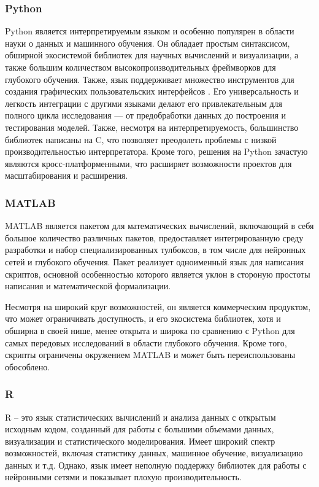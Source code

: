 \subsubsection{Python}
Python является интерпретируемым языком и особенно популярен в области науки о
данных и машинного обучения. Он обладает простым синтаксисом, обширной
экосистемой библиотек для научных вычислений и визуализации, а также большим
количеством высокопроизводительных фреймворков для глубокого обучения. Также,
язык поддерживает множество инструментов для создания графических
пользовательских интерфейсов \cite{bib:gui:web:model}. Его универсальность и
легкость интеграции с другими языками делают его привлекательным для полного
цикла исследования — от предобработки данных до построения и тестирования
моделей. Также, несмотря на интерпретируемость, большинство библиотек написаны
на C, что позволяет преодолеть проблемы с низкой производительностью
интерпретатора. Кроме того, решения на Python зачастую являются
кросс-платформенными, что расширяет возможности проектов для масштабирования и
расширения. 

\subsubsection{MATLAB} 
MATLAB является пакетом для математических вычислений, включающий в себя большое
количество различных пакетов, предоставляет интегрированную среду разработки и
набор специализированных тулбоксов, в том числе для нейронных сетей и глубокого
обучения. Пакет реализует одноименный язык для написания скриптов, основной
особенностью которого является уклон в стороную простоты написания и
математической формализации.

Несмотря на широкий круг возможностей, он является коммерческим продуктом, что
может ограничивать доступность, и его экосистема библиотек, хотя и обширна в
своей нише, менее открыта и широка по сравнению с Python для самых передовых
исследований в области глубокого обучения. Кроме того, скрипты ограничены
окружением MATLAB и может быть переиспользованы обособлено.

\subsubsection{R}

R – это язык статистических вычислений и анализа данных с открытым исходным
кодом, созданный для работы с большими объемами данных, визуализации и
статистического моделирования. Имеет широкий спектр возможностей, включая
статистику данных, машинное обучение, визуализацию данных и т.д. Однако, язык
имеет неполную поддержку библиотек для работы с нейронными сетями и показывает
плохую производительность.

